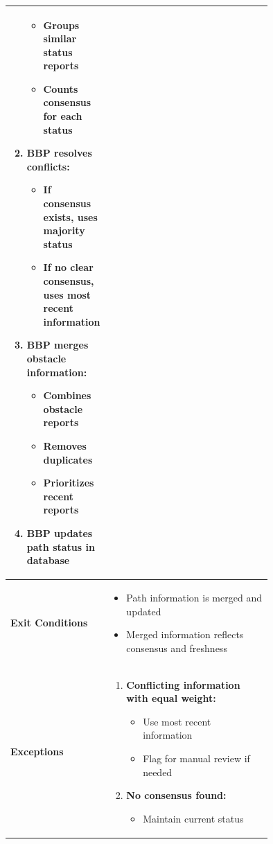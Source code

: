 \begin{center}
\begin{longtable}{|l|p{0.75\linewidth}|}
\begin{enumerate}
            \begin{itemize}
                \item Groups similar status reports
                \item Counts consensus for each status
            \end{itemize}
            \item BBP resolves conflicts:
            \begin{itemize}
                \item If consensus exists, uses majority status
                \item If no clear consensus, uses most recent information
            \end{itemize}
            \item BBP merges obstacle information:
            \begin{itemize}
                \item Combines obstacle reports
                \item Removes duplicates
                \item Prioritizes recent reports
            \end{itemize}
            \item BBP updates path status in database
        \end{enumerate} \\
        \hline
        \textbf{Exit Conditions}   & 
        \begin{itemize}
            \item Path information is merged and updated
            \item Merged information reflects consensus and freshness
        \end{itemize} \\
        \hline
        \textbf{Exceptions}       & 
        \begin{enumerate}
            \item \textbf{Conflicting information with equal weight:}
            \begin{itemize}
                \item Use most recent information
                \item Flag for manual review if needed
            \end{itemize}
            \item \textbf{No consensus found:}
            \begin{itemize}
                \item Maintain current status

\end{itemize}
\end{enumerate}
\end{longtable}
\end{center}
